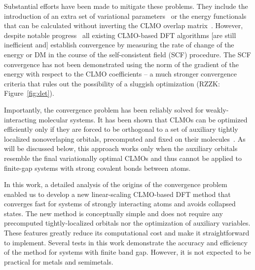\documentclass[aps,prl,twocolumn,reprint,amsmath,amssymb]{revtex4-1}
\begin{document}
Substantial efforts have been made to mitigate these problems. 
They include the introduction of an extra set of variational parameters~\cite{yang1997absolute,burger2008linear, peng2013effective} or the energy functionals that can be calculated without inverting the CLMO overlap matrix~\cite{mauri1993orbital,kim1995total,ordejon1995linear}. 
However, despite notable progress~\cite{fattebert2004linear, fattebert2006linear, osei2014accurate} all existing CLMO-based DFT algorithms [are still inefficient and] establish convergence by measuring the rate of change of the energy or DM in the course of the self-consistent field (SCF) procedure. 
The SCF convergence has not been demonstrated using the norm of the gradient of the energy with respect to the CLMO coefficients -- a much stronger convergence criteria that rules out the possibility of a sluggish optimization (RZZK: Figure~\ref{fig:det}).

Importantly, the convergence problem has been reliably solved for weakly-interacting molecular systems. 
It has been shown that CLMOs can be optimized efficiently only if they are forced to be orthogonal to a set of auxiliary tightly localized nonoverlaping orbitals, precomputed and fixed on their molecules~\cite{tsuchida2007augmented, tsuchida2008ab, khaliullin2013efficient}. 
As will be discussed below, this approach works only when the auxiliary orbitals resemble the final variationally optimal CLMOs and thus cannot be applied to finite-gap systems with strong covalent bonds between atoms. 

In this work, a detailed analysis of the origins of the convergence problem enabled us to develop a new linear-scaling CLMO-based DFT method that converges fast for systems of strongly interacting atoms and avoids collapsed states. The new method is conceptually simple and does not require any precomputed tightly-localized orbitals nor the optimization of auxiliary variables. These features greatly reduce its computational cost and make it straightforward to implement. Several tests in this work demonstrate the accuracy and efficiency of the method for systems with finite band gap. However, it is not expected to be practical for metals and semimetals.

\end{document}
